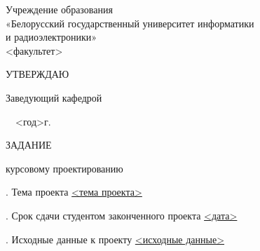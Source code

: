 
\setcounter{page}{2}
\sloppy
\thispagestyle{empty}

\begin{center}
Учреждение образования\\
«Белорусский государственный университет информатики\\
и радиоэлектроники»\\[0.5em]
<факультет>
\end{center}

\medskip

\hfill\begin{minipage}{\widthof{Заведующий кафедрой}}

  УТВЕРЖДАЮ

  Заведующий кафедрой


  \underline{\hphantom{хорошая дата }}\ \  <год>г.

\end{minipage}
\medskip

\begin{center}
  \noindent
  ЗАДАНИЕ

   курсовому проектированию

  \bigskip
\end{center}

. Тема проекта \uline{<тема проекта>}

\smallskip
{}. Срок сдачи студентом законченного проекта \uline{\hfill <дата> \hfill}

\smallskip
{}. Исходные данные к проекту \uline{<исходные данные>}

